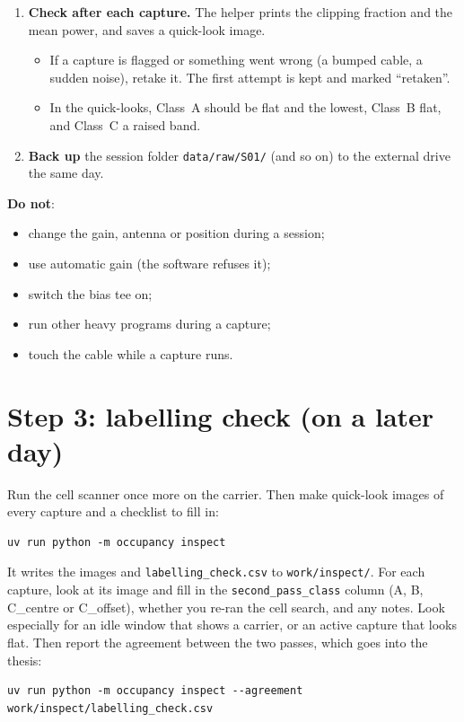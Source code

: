 \documentclass[11pt,a4paper]{article}
\newcommand{\cmd}[1]{\texttt{#1}}
\newcommand{\notebox}[1]{\par\smallskip\noindent\colorbox{boxgrey}{\begin{minipage}{\dimexpr\linewidth-2\fboxsep\relax}#1\end{minipage}}\par\smallskip}
\begin{document}
\begin{enumerate}
\begin{enumerate}[label=\alph*.]
  \item Class~C centred at $g_1$, then $g_2$.
  \item Class~C offset at $g_1$, then $g_2$. These are skipped automatically if the carrier is narrower than 10\,MHz.
  \end{enumerate}
\item \textbf{Check after each capture.} The helper prints the clipping fraction and the mean power, and saves a quick-look image.
  \begin{itemize}
  \item If a capture is flagged or something went wrong (a bumped cable, a sudden noise), retake it. The first attempt is kept and marked ``retaken''.
  \item In the quick-looks, Class~A should be flat and the lowest, Class~B flat, and Class~C a raised band.
  \end{itemize}
\item \textbf{Back up} the session folder \cmd{data/raw/S01/} (and so on) to the external drive the same day.
\end{enumerate}

\notebox{%
\textbf{Do not}:
\begin{itemize}
\item change the gain, antenna or position during a session;
\item use automatic gain (the software refuses it);
\item switch the bias tee on;
\item run other heavy programs during a capture;
\item touch the cable while a capture runs.
\end{itemize}
}

\section{Step 3: labelling check (on a later day)}
Run the cell scanner once more on the carrier. Then make quick-look images of every capture and a checklist to fill in:
\begin{Verbatim}
uv run python -m occupancy inspect
\end{Verbatim}
It writes the images and \cmd{labelling\_check.csv} to \cmd{work/inspect/}. For each capture, look at its image and fill in the \cmd{second\_pass\_class} column (A, B, C\_centre or C\_offset), whether you re-ran the cell search, and any notes. Look especially for an idle window that shows a carrier, or an active capture that looks flat. Then report the agreement between the two passes, which goes into the thesis:
\begin{Verbatim}
uv run python -m occupancy inspect --agreement work/inspect/labelling_check.csv
\end{Verbatim}
\end{document}
